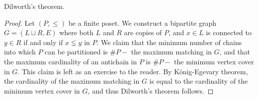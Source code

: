 \begin{corollary}
    Dilworth's theorem.
\end{corollary}
\begin{proof}
    Let $(P,\leq)$ be a finite poset. We construct a bipartite graph $G = (L \sqcup R,E)$ where both $L$ and $R$ are copies of $P$, and $x \in L$ is connected to $y \in R$ if and only if $x \lneq y$ in $P$. We claim that the minimum number of chains into which $P$ can be partitioned is $\# P -$ the maximum matching in $G$, and that the maximum cardinality of an antichain in $P$ is $\# P -$ the minimum vertex cover in $G$. This claim is left as an exercise to the reader. By K\"onig-Egevary theorem, the cardinality of the maximum matching in $G$ is equal to the cardinality of the minimum vertex cover in $G$, and thus Dilworth's theorem follows.
\end{proof}


